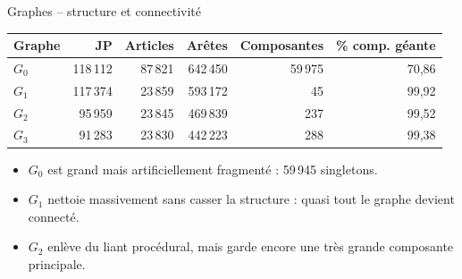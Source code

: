 \documentclass[aspectratio=169,10pt]{beamer}
\begin{document}
\begin{frame}{Graphes -- structure et connectivité}
  \scriptsize
  \begin{center}
  \renewcommand{\arraystretch}{1.12}
  \setlength{\tabcolsep}{4pt}
  \begin{tabular}{@{}l r r r r r@{}}
    \toprule
    \textbf{Graphe} & \textbf{JP} & \textbf{Articles} & \textbf{Arêtes} & \textbf{Composantes} & \textbf{\% comp. géante} \\
    \midrule
    $G_0$ & 118\,112 & 87\,821 & 642\,450 & 59\,975 & 70,86 \\
    \rowcolor{green!10}
    $G_1$ & 117\,374 & 23\,859 & 593\,172 & 45 & 99,92 \\
    \rowcolor{accentsoft}
    $G_2$ & 95\,959 & 23\,845 & 469\,839 & 237 & 99,52 \\
    $G_3$ & 91\,283 & 23\,830 & 442\,223 & 288 & 99,38 \\
    \bottomrule
  \end{tabular}
  \end{center}

  \vspace{0.3em}
  \begin{itemize}\setlength{\itemsep}{0.2em}
    \item $G_0$ est grand mais artificiellement fragmenté : 59\,945 singletons.
    \item $G_1$ nettoie massivement sans casser la structure : quasi tout le graphe devient connecté.
    \item $G_2$ enlève du liant procédural, mais garde encore une très grande composante principale.
  \end{itemize}
\end{frame}
\end{document}
